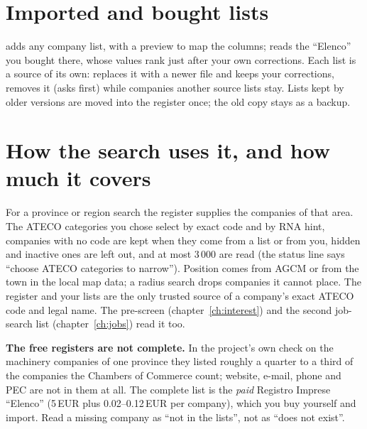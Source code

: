 \section{Imported and bought lists}\label{sec:lists}
 adds any company list, with a preview to map the columns;
 reads the ``Elenco'' you bought there, whose values rank
just after your own corrections. Each list is a source of its own: 
replaces it with a newer file and keeps your corrections,  removes it (asks first)
while companies another source lists stay. Lists kept by older versions are moved into the
register once; the old copy stays as a backup.

\section{How the search uses it, and how much it covers}
For a province or region search the register supplies the companies of that area. The ATECO
categories you chose select by exact code and by RNA hint, companies with no code are kept when
they come from a list or from you, hidden and inactive ones are left out, and at most 3\,000 are
read (the status line says ``choose ATECO categories to narrow''). Position comes from AGCM or
from the town in the local map data; a radius search drops companies it cannot place. The
register and your lists are the only trusted source of a company's exact ATECO code and legal
name. The pre-screen (chapter~\ref{ch:interest}) and the second job-search list
(chapter~\ref{ch:jobs}) read it too.

\begin{warnbox}
\textbf{The free registers are not complete.} In the project's own check on the machinery
companies of one province they listed roughly a quarter to a third of the companies the
Chambers of Commerce count; website, e-mail, phone and PEC are not in them at all. The
complete list is the \emph{paid} Registro Imprese ``Elenco'' (5\,EUR plus 0.02--0.12\,EUR per
company), which you buy yourself and import. Read a missing company as ``not in the lists'',
not as ``does not exist''.
\end{warnbox}
